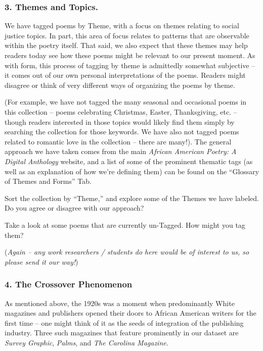 \documentclass[
  letterpaper,
  DIV=11,
  numbers=noendperiod]{scrartcl}
\begin{document}
\subsubsection{3. Themes and Topics.}\label{themes-and-topics.}

We have tagged poems by Theme, with a focus on themes relating to social
justice topics. In part, this area of focus relates to patterns that are
observable within the poetry itself. That said, we also expect that
these themes may help readers today see how these poems might be
relevant to our present moment. As with form, this process of tagging by
theme is admittedly somewhat subjective -- it comes out of our own
personal interpretations of the poems. Readers might disagree or think
of very different ways of organizing the poems by theme.

(For example, we have not tagged the many seasonal and occasional poems
in this collection -- poems celebrating Christmas, Easter, Thanksgiving,
etc. -- though readers interested in those topics would likely find them
simply by searching the collection for those keywords. We have also not
tagged poems related to romantic love in the collection -- there are
many!). The general approach we have taken comes from the main
\emph{African American Poetry: A Digital Anthology} website, and a list
of some of the prominent thematic tags (as well as an explanation of how
we're defining them) can be found on the ``Glossary of Themes and
Forms'' Tab.

Sort the collection by ``Theme,'' and explore some of the Themes we have
labeled. Do you agree or disagree with our approach?

Take a look at some poems that are currently un-Tagged. How might you
tag them?

(\emph{Again -- any work researchers / students do here would be of
interest to us, so please send it our way!})

\subsubsection{4. The Crossover
Phenomenon}\label{the-crossover-phenomenon}

As mentioned above, the 1920s was a moment when predominantly White
magazines and publishers opened their doors to African American writers
for the first time -- one might think of it as the seeds of integration
of the publishing industry. Three such magazines that feature
prominently in our dataset are \emph{Survey Graphic}, \emph{Palms}, and
\emph{The Carolina Magazine}.
\end{document}
